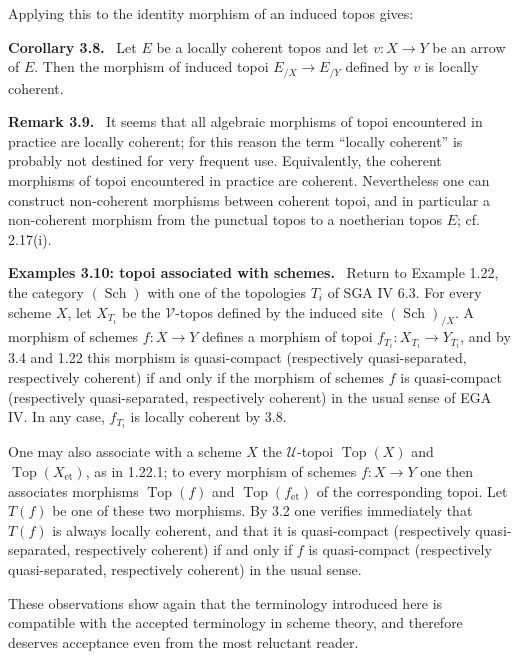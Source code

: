 \documentclass[11pt]{article}
\newcommand{\U}{\mathcal{U}}
\newcommand{\V}{\mathcal{V}}
\newcommand{\Top}{\operatorname{Top}}
\newcommand{\Sch}{\operatorname{Sch}}
\newenvironment{statement}[1]{\par\medskip\noindent\textbf{#1.}\ }{\par\medskip}
\newenvironment{remarktext}[1]{\par\medskip\noindent\textbf{#1.}\ }{\par\medskip}
\begin{document}
Applying this to the identity morphism of an induced topos gives:

\begin{statement}{Corollary 3.8}
Let \(E\) be a locally coherent topos and let \(v:X\to Y\) be an arrow of \(E\). Then the morphism of induced topoi \(E_{/X}\to E_{/Y}\) defined by \(v\) is locally coherent.
\end{statement}

\begin{remarktext}{Remark 3.9}
It seems that all algebraic morphisms of topoi encountered in practice are locally coherent; for this reason the term ``locally coherent'' is probably not destined for very frequent use. Equivalently, the coherent morphisms of topoi encountered in practice are coherent. Nevertheless one can construct non-coherent morphisms between coherent topoi, and in particular a non-coherent morphism from the punctual topos to a noetherian topos \(E\); cf. 2.17(i).
\end{remarktext}

\begin{remarktext}{Examples 3.10: topoi associated with schemes}
Return to Example 1.22, the category \((\Sch)\) with one of the topologies \(T_i\) of SGA IV 6.3. For every scheme \(X\), let \(X_{T_i}\) be the \(\V\)-topos defined by the induced site \((\Sch)_{/X}\). A morphism of schemes \(f:X\to Y\) defines a morphism of topoi \(f_{T_i}:X_{T_i}\to Y_{T_i}\), and by 3.4 and 1.22 this morphism is quasi-compact (respectively quasi-separated, respectively coherent) if and only if the morphism of schemes \(f\) is quasi-compact (respectively quasi-separated, respectively coherent) in the usual sense of EGA IV. In any case, \(f_{T_i}\) is locally coherent by 3.8.

One may also associate with a scheme \(X\) the \(\U\)-topoi \(\Top(X)\) and \(\Top(X_{\mathrm{et}})\), as in 1.22.1; to every morphism of schemes \(f:X\to Y\) one then associates morphisms \(\Top(f)\) and \(\Top(f_{\mathrm{et}})\) of the corresponding topoi. Let \(T(f)\) be one of these two morphisms. By 3.2 one verifies immediately that \(T(f)\) is always locally coherent, and that it is quasi-compact (respectively quasi-separated, respectively coherent) if and only if \(f\) is quasi-compact (respectively quasi-separated, respectively coherent) in the usual sense.

These observations show again that the terminology introduced here is compatible with the accepted terminology in scheme theory, and therefore deserves acceptance even from the most reluctant reader.
\end{remarktext}
\end{document}
